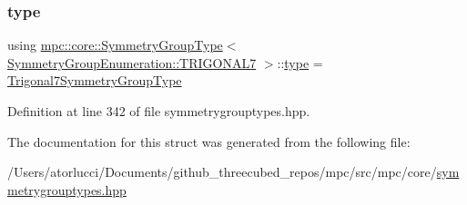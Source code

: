 \subsubsection{\texorpdfstring{type}{type}}
{\footnotesize\ttfamily using \mbox{\hyperlink{structmpc_1_1core_1_1_symmetry_group_type}{mpc\+::core\+::\+Symmetry\+Group\+Type}}$<$ \mbox{\hyperlink{namespacempc_1_1core_a9d979684062547055a0ef5c13077bad8ab347d6d7556c0d38dc3d111b08a50dee}{Symmetry\+Group\+Enumeration\+::\+T\+R\+I\+G\+O\+N\+A\+L7}} $>$\+::\mbox{\hyperlink{structmpc_1_1core_1_1_symmetry_group_type_3_01_symmetry_group_enumeration_1_1_t_r_i_g_o_n_a_l7_01_4_a19c2ab6d3c1bdfcc28a69e76453e54cf}{type}} =  \mbox{\hyperlink{structmpc_1_1core_1_1_trigonal7_symmetry_group_type}{Trigonal7\+Symmetry\+Group\+Type}}}



Definition at line 342 of file symmetrygrouptypes.\+hpp.



The documentation for this struct was generated from the following file\+:\begin{DoxyCompactItemize}
\item 
/\+Users/atorlucci/\+Documents/github\+\_\+threecubed\+\_\+repos/mpc/src/mpc/core/\mbox{\hyperlink{symmetrygrouptypes_8hpp}{symmetrygrouptypes.\+hpp}}\end{DoxyCompactItemize}
